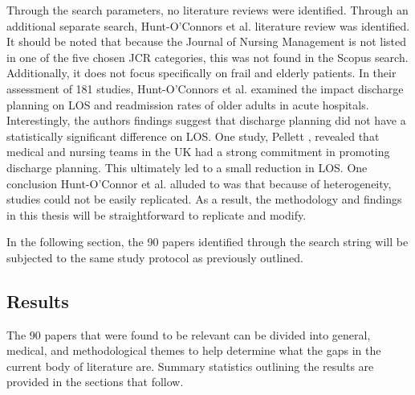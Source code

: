 \documentclass[../thesis.tex]{subfiles}
\begin{document}
Through the search parameters, no literature reviews were identified.
Through an additional separate search, Hunt-O'Connors et al. \cite{OConnor2021} literature review was identified. It should be noted that because the Journal of Nursing Management is not listed in one of the five chosen JCR categories, this was not found in the Scopus search. Additionally, it does not focus specifically on frail and elderly patients. In their assessment of 181 studies, Hunt-O'Connors et al. \cite{OConnor2021} examined the impact discharge planning on LOS and readmission rates of older adults in acute hospitals. Interestingly, the authors findings suggest that discharge planning did not have a statistically significant difference on LOS. One study, Pellett \cite{Pellett2016}, revealed that medical and nursing teams in the UK had a strong commitment in promoting discharge planning. This ultimately led to a small reduction in LOS. One conclusion Hunt-O'Connor et al. \cite{OConnor2021} alluded to was that because of heterogeneity, studies could not be easily replicated. As a result, the methodology and findings in this thesis will be straightforward to replicate and modify. 

In the following section, the 90 papers identified through the search string will be subjected to the same study protocol as previously outlined. 

\subsection{Results}\label{sec:lr2results}
The 90 papers that were found to be relevant can be divided into general, medical, and methodological themes to help determine what the gaps in the current body of literature are. Summary statistics outlining the results are provided in the sections that follow.
\end{document}
